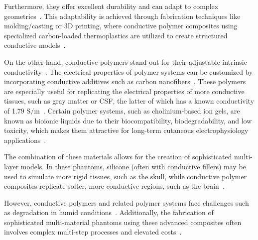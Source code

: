 Furthermore, they offer excellent durability and can adapt to complex geometries~\cite{Owda2020, akor-2025}. This adaptability is achieved through fabrication techniques like molding/casting or 3D printing, where conductive polymer composites using specialized carbon-loaded thermoplastics are utilized to create structured conductive models~\cite{akor-2025}.

On the other hand, conductive polymers stand out for their adjustable intrinsic conductivity~\cite{C5TC01888A}. The electrical properties of polymer systems can be customized by incorporating conductive additives such as carbon nanofibers~\cite{9475461}. These polymers are especially useful for replicating the electrical properties of more conductive tissues, such as gray matter or CSF, the latter of which has a known conductivity of 1.79 $\text{S/m}$~\cite{Collier2012}. Certain polymer systems, such as cholinium-based ion gels, are known as bioionic liquids due to their biocompatibility, biodegradability, and low toxicity, which makes them attractive for long-term cutaneous electrophysiology applications~\cite{C5TC01888A}.

The combination of these materials allows for the creation of sophisticated multi-layer models. In these phantoms, silicone (often with conductive fillers) may be used to simulate more rigid tissues, such as the skull, while conductive polymer composites replicate softer, more conductive regions, such as the brain~\cite{Collier2012, akor-2025}.

However, conductive polymers and related polymer systems face challenges such as degradation in humid conditions~\cite{paz-2020}. Additionally, the fabrication of sophisticated multi-material phantoms using these advanced composites often involves complex multi-step processes and elevated costs~\cite{akor-2025}.

